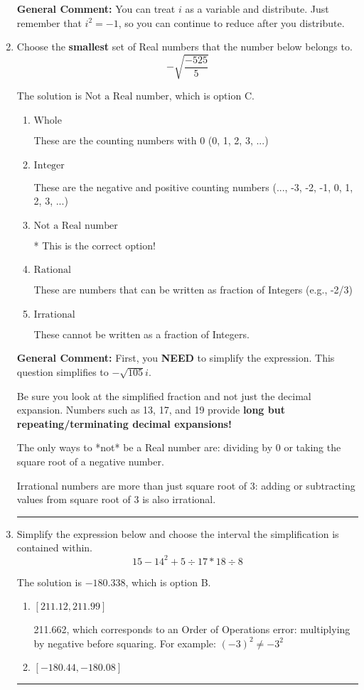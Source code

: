 \documentclass{extbook}[14pt]
\newcommand{\litem}[1]{\item #1

\rule{\textwidth}{0.4pt}}
\begin{document}
\begin{enumerate}
{\textbf{General Comment:} You can treat $i$ as a variable and distribute. Just remember that $i^2=-1$, so you can continue to reduce after you distribute.
}
\litem{
Choose the \textbf{smallest} set of Real numbers that the number below belongs to.
\[ -\sqrt{\frac{-525}{5}} \]

The solution is \( \text{Not a Real number} \), which is option C.\begin{enumerate}[label=\Alph*.]
\item \( \text{Whole} \)

These are the counting numbers with 0 (0, 1, 2, 3, ...)
\item \( \text{Integer} \)

These are the negative and positive counting numbers (..., -3, -2, -1, 0, 1, 2, 3, ...)
\item \( \text{Not a Real number} \)

* This is the correct option!
\item \( \text{Rational} \)

These are numbers that can be written as fraction of Integers (e.g., -2/3)
\item \( \text{Irrational} \)

These cannot be written as a fraction of Integers.
\end{enumerate}

\textbf{General Comment:} First, you \textbf{NEED} to simplify the expression. This question simplifies to $-\sqrt{105} i$. 
 
 Be sure you look at the simplified fraction and not just the decimal expansion. Numbers such as 13, 17, and 19 provide \textbf{long but repeating/terminating decimal expansions!} 
 
 The only ways to *not* be a Real number are: dividing by 0 or taking the square root of a negative number. 
 
 Irrational numbers are more than just square root of 3: adding or subtracting values from square root of 3 is also irrational.
}
\litem{
Simplify the expression below and choose the interval the simplification is contained within.
\[ 15 - 14^2 + 5 \div 17 * 18 \div 8 \]

The solution is \( -180.338 \), which is option B.\begin{enumerate}[label=\Alph*.]
\item \( [211.12, 211.99] \)

 211.662, which corresponds to an Order of Operations error: multiplying by negative before squaring. For example: $(-3)^2 \neq -3^2$
\item \( [-180.44, -180.08] \)


\end{enumerate}}
\end{enumerate}
\end{document}
